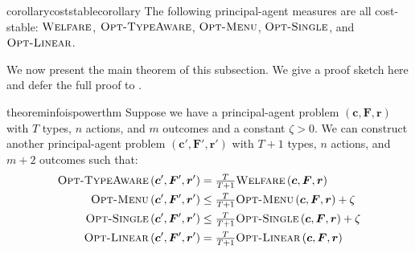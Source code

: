 \documentclass{article}
\newcommand{\costvector}{\bm{c}}
\newcommand{\ForecastTensor}{\bm{F}}
\newcommand{\rewardvector}{\bm{r}}
\newcommand{\PrincipalAgentProblem}{\left(\costvector, \ForecastTensor, \rewardvector\right)}
\newcommand{\PrincipalAgentProblemPrime}{\left(\costvector', \ForecastTensor', \rewardvector'\right)}
\newcommand{\OWelfare}{\textsc{Welfare}}
\newcommand{\OTypeAware}{\textsc{Opt-TypeAware}}
\newcommand{\OMenu}{\textsc{Opt-Menu}}
\newcommand{\OSingle}{\textsc{Opt-Single}}
\newcommand{\OLinear}{\textsc{Opt-Linear}}
\begin{document}
\begin{restatable}{corollary}{coststablecorollary}
\label{cor:cost-stable}
  The following principal-agent measures are all cost-stable: $\OWelfare$, $\OTypeAware$, $\OMenu$, $\OSingle$, and $\OLinear$.
\end{restatable}

We now present the main theorem of this subsection. We give a proof sketch here and defer the full proof to .

\begin{restatable}{theorem}{infoispowerthm}
\label{thm:info-is-power}
  Suppose we have a principal-agent problem $\PrincipalAgentProblem$ with $T$ types, $n$ actions, and $m$ outcomes and a constant $\zeta > 0$. We can construct another principal-agent problem $\PrincipalAgentProblemPrime$ with $T+1$ types, $n$ actions, and $m+2$ outcomes such that:
  \begin{align*}
    \OTypeAware \PrincipalAgentProblemPrime &= \tfrac{T}{T+1} \OWelfare \PrincipalAgentProblem \\
    \OMenu \PrincipalAgentProblemPrime      &\le \tfrac{T}{T+1} \OMenu \PrincipalAgentProblem + \zeta \\
    \OSingle \PrincipalAgentProblemPrime    &\le \tfrac{T}{T+1} \OSingle \PrincipalAgentProblem + \zeta \\
    \OLinear \PrincipalAgentProblemPrime    &= \tfrac{T}{T+1} \OLinear \PrincipalAgentProblem
  \end{align*}
\end{restatable}
\end{document}
